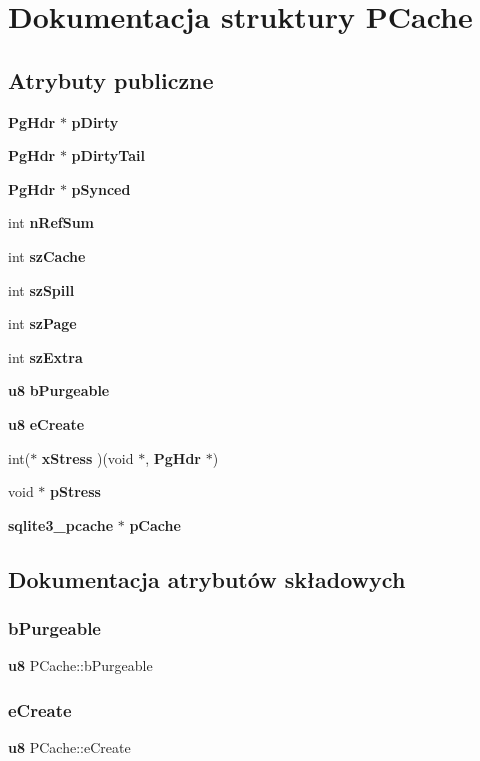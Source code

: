 \section{Dokumentacja struktury P\+Cache}
\label{struct_p_cache}
\subsection*{Atrybuty publiczne}
\begin{DoxyCompactItemize}
\item 
\textbf{ Pg\+Hdr} $\ast$ \textbf{ p\+Dirty}
\item 
\textbf{ Pg\+Hdr} $\ast$ \textbf{ p\+Dirty\+Tail}
\item 
\textbf{ Pg\+Hdr} $\ast$ \textbf{ p\+Synced}
\item 
int \textbf{ n\+Ref\+Sum}
\item 
int \textbf{ sz\+Cache}
\item 
int \textbf{ sz\+Spill}
\item 
int \textbf{ sz\+Page}
\item 
int \textbf{ sz\+Extra}
\item 
\textbf{ u8} \textbf{ b\+Purgeable}
\item 
\textbf{ u8} \textbf{ e\+Create}
\item 
int($\ast$ \textbf{ x\+Stress} )(void $\ast$, \textbf{ Pg\+Hdr} $\ast$)
\item 
void $\ast$ \textbf{ p\+Stress}
\item 
\textbf{ sqlite3\+\_\+pcache} $\ast$ \textbf{ p\+Cache}
\end{DoxyCompactItemize}


\subsection{Dokumentacja atrybutów składowych}
\mbox{\label{struct_p_cache_a87ff1d0738734375524e544cefa33b01}} 
\subsubsection{bPurgeable}
{\footnotesize\ttfamily \textbf{ u8} P\+Cache\+::b\+Purgeable}

\mbox{\label{struct_p_cache_a28629953493154d29ab7b6485a0471bf}} 
\subsubsection{eCreate}
{\footnotesize\ttfamily \textbf{ u8} P\+Cache\+::e\+Create}

